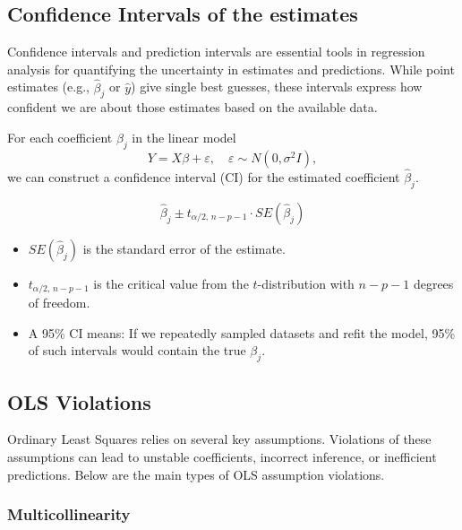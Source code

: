 \documentclass[10pt,a4paper]{article}
\begin{document}
	\subsection{Confidence Intervals of the estimates}

	Confidence intervals and prediction intervals are essential tools in regression analysis for quantifying the uncertainty in estimates and predictions.
	While point estimates (e.g., $\hat{\beta}_j$ or $\hat{y}$) give single best guesses, these intervals express how confident we are about those estimates based on the available data.

	For each coefficient $\beta_j$ in the linear model
	\[
	Y = X\beta + \varepsilon, \quad \varepsilon \sim N(0, \sigma^2 I),
	\]
	we can construct a confidence interval (CI) for the estimated coefficient $\hat{\beta}_j$.

	 		\[
		\hat{\beta}_j \pm t_{\alpha/2,\, n-p-1} \cdot SE(\hat{\beta}_j)
		\]


	\begin{itemize}
		\item $SE(\hat{\beta}_j)$ is the standard error of the estimate.
		\item $t_{\alpha/2,\, n-p-1}$ is the critical value from the $t$-distribution with $n - p - 1$ degrees of freedom.
		\item A 95\% CI means: If we repeatedly sampled datasets and refit the model, 95\% of such intervals would contain the true $\beta_j$.
	\end{itemize}


	\subsection{OLS Violations}

	Ordinary Least Squares relies on several key assumptions.
	Violations of these assumptions can lead to unstable coefficients, incorrect inference,
	or inefficient predictions. Below are the main types of OLS assumption violations.

	\subsubsection{Multicollinearity}
\end{document}
